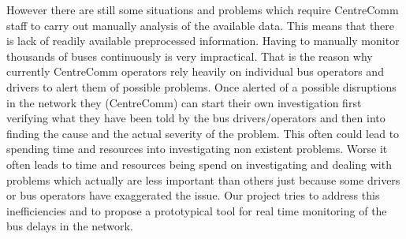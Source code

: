 However there are still some situations and problems which require CentreComm staff to carry out manually analysis of the available data. This means that there is lack of readily available preprocessed information. Having to manually monitor thousands of buses continuously is very impractical. That is the reason why currently CentreComm operators rely heavily on individual bus operators and drivers to alert them of possible problems. Once alerted of a possible disruptions in the network they (CentreComm) can start their own investigation first verifying what they have been told by the bus drivers/operators and then into finding the cause and the actual severity of the problem. This often could lead to spending time and resources into investigating non existent problems. Worse it often leads to time and resources being spend on investigating and dealing with problems which actually are less important than others just because some drivers or bus operators have exaggerated the issue. Our project tries to address this inefficiencies and  to propose a prototypical tool for real time monitoring of the bus delays in the network.


